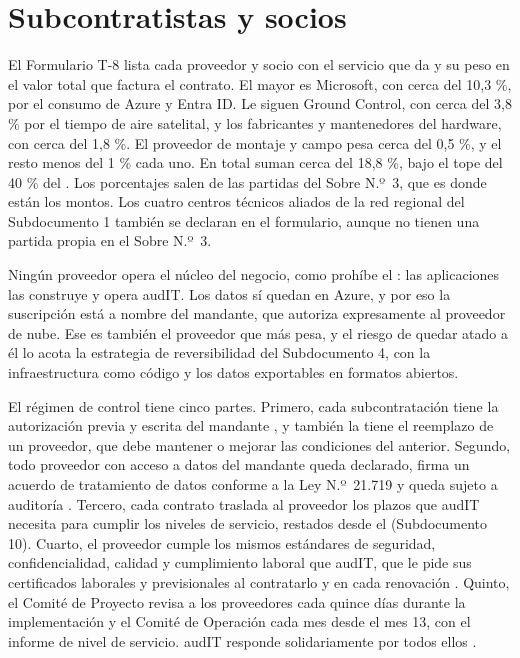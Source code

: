 \section{Subcontratistas y socios}\label{sec:12-subcontratistas-y-socios}

El Formulario T-8 lista cada proveedor y socio con el servicio que da y su peso en el valor total que
factura el contrato. El mayor es Microsoft, con cerca del 10,3 \%, por el consumo de Azure y Entra ID.
Le siguen Ground Control, con cerca del 3,8 \% por el tiempo de aire satelital, y los fabricantes y
mantenedores del hardware, con cerca del 1,8 \%. El proveedor de montaje y campo pesa cerca del 0,5 \%, y
el resto menos del 1 \% cada uno. En total suman cerca del 18,8 \%, bajo el tope del 40 \% del . Los porcentajes salen de las partidas del
Sobre N.º~3, que es donde están los montos. Los cuatro centros técnicos aliados de la red regional del
Subdocumento 1 también se declaran en el formulario, aunque no tienen una partida propia en el Sobre
N.º~3.

Ningún proveedor opera el núcleo del negocio, como prohíbe el : las aplicaciones las
construye y opera audIT. Los datos sí quedan en Azure, y por eso la suscripción está a nombre del
mandante, que autoriza expresamente al proveedor de nube. Ese es también el proveedor que más pesa, y el
riesgo de quedar atado a él lo acota la estrategia de reversibilidad del Subdocumento 4, con la
infraestructura como código y los datos exportables en formatos abiertos.

El régimen de control tiene cinco partes. Primero, cada subcontratación tiene la autorización previa y
escrita del mandante , y también la tiene el reemplazo de un proveedor, que debe
mantener o mejorar las condiciones del anterior. Segundo, todo proveedor con acceso a datos del mandante
queda declarado, firma un acuerdo de tratamiento de datos conforme a la Ley N.º~21.719 y queda sujeto a
auditoría . Tercero, cada contrato traslada al proveedor los plazos que audIT necesita para
cumplir los niveles de servicio, restados desde el  (Subdocumento 10). Cuarto, el
proveedor cumple los mismos estándares de seguridad, confidencialidad, calidad y cumplimiento laboral
que audIT, que le pide sus certificados laborales y previsionales al contratarlo y en cada renovación
. Quinto, el Comité de Proyecto revisa a los proveedores cada quince días durante la
implementación y el Comité de Operación cada mes desde el mes 13, con el informe de nivel de servicio.
audIT responde solidariamente por todos ellos .

